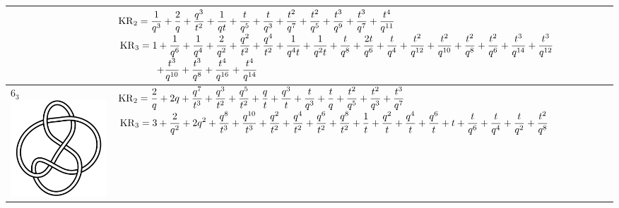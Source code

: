 \documentclass{compositio}
\theoremstyle{definition}
\numberwithin{equation}{section}
\begin{document}
{\begin{longtable}{p{}|p{}}
& 
$
\displaystyle{%
\KR_{2} = \frac{1}{q^3}+\frac{2}{q}+\frac{q^3}{t^2}+\frac{1}{q t}+\frac{t}{q^5}+\frac{t}{q^3}+\frac{t^2}{q^7}+\frac{t^2}{q^5}+\frac{t^3}{q^9}+\frac{t^3}{q^7}+\frac{t^4}{q^{11}}
}
$
\newline 
$
\displaystyle{%
\KR_{3} = 1+\frac{1}{q^6}+\frac{1}{q^4}+\frac{2}{q^2}+\frac{q^2}{t^2}+\frac{q^4}{t^2}+\frac{1}{q^4 t}+\frac{1}{q^2 t}+\frac{t}{q^8}+\frac{2 t}{q^6}+\frac{t}{q^4}+\frac{t^2}{q^{12}}+\frac{t^2}{q^{10}}+\frac{t^2}{q^8}+\frac{t^2}{q^6}+\frac{t^3}{q^{14}}+\frac{t^3}{q^{12}}
}
$
\newline
$
\displaystyle{%
\qquad\qquad +\frac{t^3}{q^{10}}+\frac{t^3}{q^8}+\frac{t^4}{q^{16}}+\frac{t^4}{q^{14}}
}
$
\\
\hline
$6_{3}$ 
\includegraphics[scale=0.07,angle=0]{knot6_3.pdf} 
& 
$
\displaystyle{%
\KR_{2} = \frac{2}{q}+2 q+\frac{q^7}{t^3}+\frac{q^3}{t^2}+\frac{q^5}{t^2}+\frac{q}{t}+\frac{q^3}{t}+\frac{t}{q^3}+\frac{t}{q}+\frac{t^2}{q^5}+\frac{t^2}{q^3}+\frac{t^3}{q^7}
}
$
\newline 
$
\displaystyle{%
\KR_{3} = 3+\frac{2}{q^2}+2 q^2+\frac{q^8}{t^3}+\frac{q^{10}}{t^3}+\frac{q^2}{t^2}+\frac{q^4}{t^2}+\frac{q^6}{t^2}+\frac{q^8}{t^2}+\frac{1}{t}+\frac{q^2}{t}+\frac{q^4}{t}+\frac{q^6}{t}+t+\frac{t}{q^6}+\frac{t}{q^4}+\frac{t}{q^2}+\frac{t^2}{q^8}
}
$
\newline

\end{longtable}}
\end{document}
